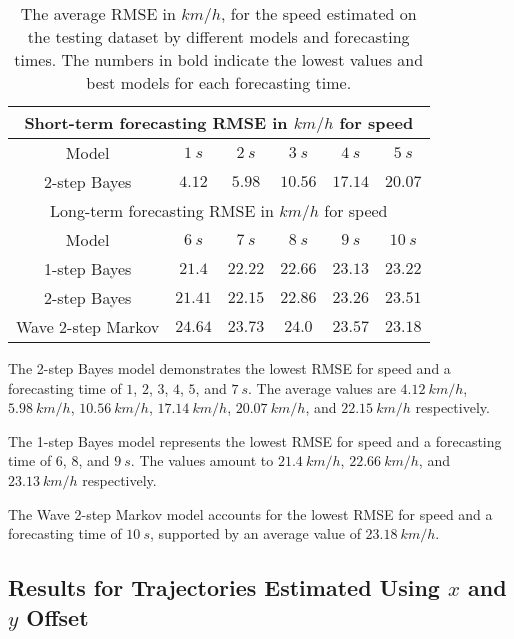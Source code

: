 \documentclass[preprint,12pt]{elsarticle}
\begin{document}
\begin{table}[!ht]
	\centering
	\begin{tabular}{|c|c|c|c|c|c|}
		\hline
		\multicolumn{6}{|c|}{Short-term forecasting RMSE in $km/h$ for speed} \\ \hline
		Model & $1 \ s$ & $2 \ s$ & $3 \ s$ & $4 \ s$ & $5 \ s$ \\ \hline
		2-step Bayes & $\mathbf{4.12}$ & $\mathbf{5.98}$ & $\mathbf{10.56}$ & $\mathbf{17.14}$ & $\mathbf{20.07}$ \\ \hline
		\multicolumn{6}{|c|}{Long-term forecasting RMSE in $km/h$ for speed} \\ \hline
		Model & $6 \ s$ & $7 \ s$ & $8 \ s$ & $9 \ s$ & $10 \ s$ \\ \hline
		1-step Bayes & $\mathbf{21.4}$ & $22.22$ & $\mathbf{22.66}$ & $\mathbf{23.13}$ & $23.22$ \\ \hline
		2-step Bayes & $21.41$ & $\mathbf{22.15}$ & $22.86$ & $23.26$ & $23.51$ \\ \hline
		Wave 2-step Markov & $24.64$ & $23.73$ & $24.0$ & $23.57$ & $\mathbf{23.18}$ \\ \hline
	\end{tabular}
	\caption{The average RMSE in $km/h$, for the speed estimated on the testing dataset by different models and forecasting times. The numbers in bold indicate the lowest values and best models for each forecasting time.}
	\label{tab:best_speed_RMSE}
\end{table}

The 2-step Bayes model demonstrates the lowest RMSE for speed and a forecasting time of $1$, $2$, $3$, $4$, $5$, and $7 \ s$. The average values are $4.12 \ km/h$, $5.98 \ km/h$, $10.56 \ km/h$, $17.14 \ km/h$, $20.07 \ km/h$, and $22.15 \ km/h$ respectively.

The 1-step Bayes model represents the lowest RMSE for speed and a forecasting time of $6$, $8$, and $9 \ s$. The values amount to $21.4 \ km/h$, $22.66 \ km/h$, and $23.13 \ km/h$ respectively.

The Wave 2-step Markov model accounts for the lowest RMSE for speed and a forecasting time of $10 \ s$, supported by an average value of $23.18 \ km/h$.

\subsection{Results for Trajectories Estimated Using $x$ and $y$ Offset}
\end{document}
